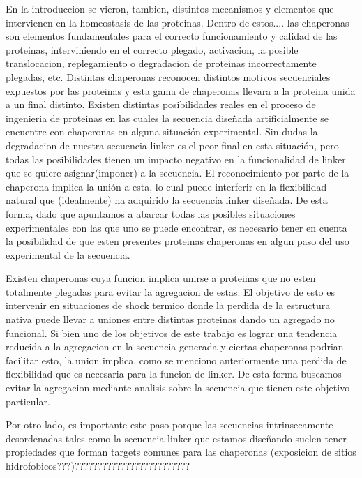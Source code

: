 
En la introduccion se vieron, tambien, distintos mecanismos y elementos que intervienen en la homeostasis de las proteinas. Dentro de estos.... 
las chaperonas son elementos fundamentales para el correcto funcionamiento y calidad de las proteinas, interviniendo en el correcto plegado, activacion, la posible translocacion, replegamiento o degradacion de proteinas incorrectamente plegadas, etc.
Distintas chaperonas reconocen distintos motivos secuenciales expuestos por las proteinas y esta gama de chaperonas llevara a la proteina unida a un final distinto.
Existen distintas posibilidades reales en el proceso de ingenieria de proteinas en las cuales la secuencia diseñada artificialmente se encuentre con chaperonas en alguna situación experimental. Sin dudas la degradacion de nuestra secuencia linker es el peor final en esta situación, 
pero todas las posibilidades tienen un impacto negativo en la funcionalidad de linker que se quiere asignar(imponer) a la secuencia. El reconocimiento por parte de la chaperona implica la unión a esta, lo cual puede interferir en la flexibilidad natural que (idealmente) ha adquirido la secuencia linker diseñada. 
De esta forma, dado que apuntamos a abarcar todas las posibles situaciones experimentales con las que uno se puede encontrar, es necesario tener en cuenta la posibilidad de que esten presentes proteinas chaperonas en algun paso del uso experimental de la secuencia. 
 
Existen chaperonas cuya funcion implica unirse a proteinas que no esten totalmente plegadas para evitar la agregacion de estas. El objetivo de esto es intervenir en situaciones de shock termico donde la perdida de la estructura nativa puede llevar a uniones entre distintas proteinas dando un agregado no funcional.
Si bien uno de los objetivos de este trabajo es lograr una tendencia reducida a la agregacion en la secuencia generada y ciertas chaperonas podrian facilitar esto, la union implica, como se menciono anteriormente una perdida de flexibilidad que es necesaria para la funcion de linker. 
De esta forma buscamos evitar la agregacion mediante analisis sobre la secuencia que tienen este objetivo particular.

Por otro lado, es importante este paso porque las secuencias intrinsecamente desordenadas tales como la secuencia linker que estamos diseñando suelen tener propiedades que forman targets comunes para las chaperonas (exposicion de sitios hidrofobicos???)?????????????????????????



